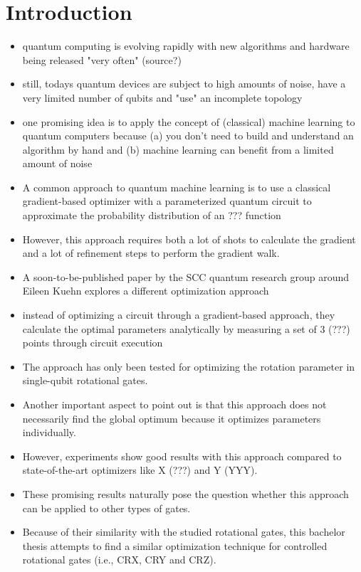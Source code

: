 \chapter{Introduction} %


\begin{itemize}
    \item quantum computing is evolving rapidly with new algorithms and hardware being released "very often" (source?)
    \item still, todays quantum devices are subject to high amounts of noise, have a very limited number of qubits and "use" an incomplete topology
    \item one promising idea is to apply the concept of (classical) machine learning to quantum computers because (a) you don't need to build and understand an algorithm by hand and (b) machine learning can benefit from a limited amount of noise
    \item A common approach to quantum machine learning is to use a classical gradient-based optimizer with a parameterized quantum circuit to approximate the probability distribution of an ??? function
    \item However, this approach requires both a lot of shots to calculate the gradient and a lot of refinement steps to perform the gradient walk.
    \item A soon-to-be-published paper by the SCC quantum research group around Eileen Kuehn explores a different optimization approach
    \item instead of optimizing a circuit through a gradient-based approach, they calculate the optimal parameters analytically by measuring a set of 3 (???) points through circuit execution
    \item The approach has only been tested for optimizing the rotation parameter in single-qubit rotational gates.
    \item Another important aspect to point out is that this approach does not necessarily find the global optimum because it optimizes parameters individually.
    \item However, experiments show good results with this approach compared to state-of-the-art optimizers like X (???) and Y (YYY).
    \item These promising results naturally pose the question whether this approach can be applied to other types of gates.
    \item Because of their similarity with the studied rotational gates, this bachelor thesis attempts to find a similar optimization technique for controlled rotational gates (i.e., CRX, CRY and CRZ).
\end{itemize}

